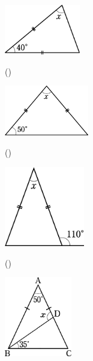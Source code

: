 \documentclass[
  12pt,a4paper,lualatex,ja=standard]{bxjsarticle}
\begin{document}
\begin{flushleft}
\begin{multicols}{2}
\begin{center}
\def\@captype{figure}
\includegraphics[height=22mm]{media/tu1.jpg}

\end{center}

\columnbreak

()\hspace{2.5pt}

\begin{center}
\def\@captype{figure}
\includegraphics[height=22mm]{media/tu2.jpg}

\end{center}

\end{multicols}

\vspace{5mm}

\begin{multicols}{2}
()\hspace{2.5pt}

\begin{center}
\def\@captype{figure}
\includegraphics[height=35mm]{media/tu3.jpg}

\end{center}

\columnbreak

()\hspace{2.5pt}

\begin{center}
\def\@captype{figure}
\includegraphics[height=35mm]{media/tu6.jpg}


\end{center}
\end{multicols}
\end{flushleft}
\end{document}
